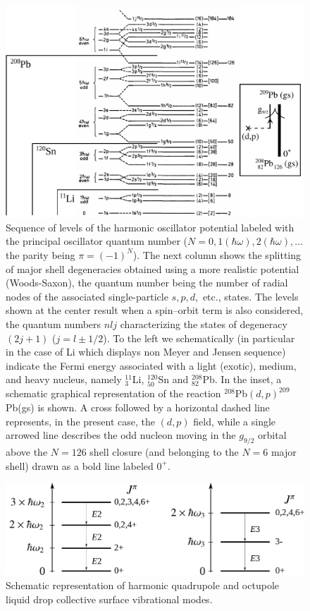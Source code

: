 \begin{figure}
	\centerline {
		\includegraphics*[width=12cm]{introduccion/figs/figpreface3}
	}
	\caption{Sequence of levels of the harmonic oscillator potential labeled with the principal oscillator quantum number ($N=0,1 (\hbar\omega), 2(\hbar\omega),\dots$ the parity being $\pi=(-1)^N$). The next column shows the splitting of major shell degeneracies obtained using a more realistic potential (Woods-Saxon), the quantum number being the number of radial nodes of the associated single-particle $s,p,d,$ etc., states. The levels shown at the center result when a spin--orbit term is also considered, the quantum numbers $nlj$ characterizing the states of degeneracy $(2j+1)$ ($j=l\pm1/2$). To the left we schematically (in particular in the case of Li which displays non Meyer and Jensen sequence) indicate the Fermi energy associated with a light (exotic), medium, and heavy nucleus, namely $^{11}_3$Li, $^{120}_{50}$Sn and $^{208}_{82}$Pb. In the inset, a schematic graphical representation of the reaction $^{208}$Pb$(d,p)^{209}$Pb(gs) is shown. A cross followed by a horizontal dashed line represents, in the present case,  the $(d,p)$ field, while a  single arrowed line describes the odd nucleon moving in the $g_{9/2}$ orbital above the $N=126$ shell closure (and belonging to the $N=6$ major shell) drawn as a bold line labeled $0^+$.}
	\label{fig1.0.3}
\end{figure}
\begin{figure}
	\centerline {
		\includegraphics*[width=12cm]{introduccion/figs/fig1_1_4}
	}
	\caption{Schematic representation of harmonic quadrupole and octupole liquid drop collective surface vibrational modes.}
	\label{fig1.0.4}
\end{figure}

